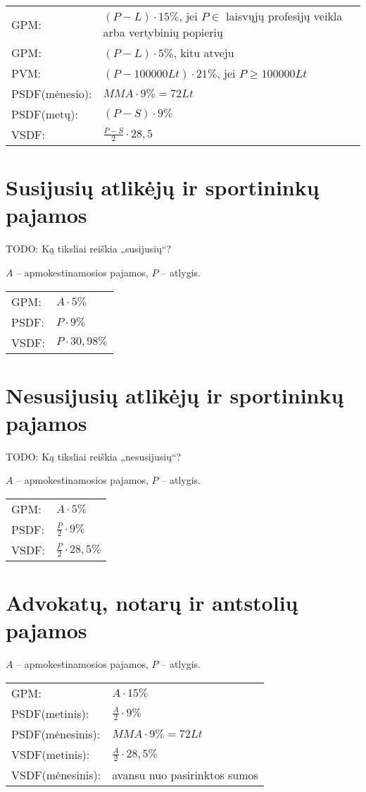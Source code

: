 \begin{tabularx}{15cm}{p{7.5cm}|p{7.5cm}}
  GPM: & $(P - L) \cdot 15\%$, jei $P \in$ laisvųjų profesijų veikla arba
    vertybinių popierių \\
  GPM: & $(P - L) \cdot 5\%$, kitu atveju \\
  PVM: & $(P - 100 000 Lt) \cdot 21\%$, jei $P \geq 100 000 Lt$ \\
  PSDF(mėnesio): & $MMA \cdot 9\% = 72 Lt$ \\
  PSDF(metų): & $(P - S) \cdot 9\%$ \\
  VSDF: & $\frac{P-S}{2} \cdot 28,5$ \\
\end{tabularx}

\section{Susijusių atlikėjų ir sportininkų pajamos}

TODO: Ką tiksliai reiškia „susijusių“?

$A$ – apmokestinamosios pajamos, $P$ – atlygis.

\begin{tabularx}{15cm}{p{7.5cm}|p{7.5cm}}
  GPM: & $A \cdot 5\%$ \\
  PSDF: & $P \cdot 9\%$ \\
  VSDF: & $P \cdot 30,98\%$ \\
\end{tabularx}

\section{Nesusijusių atlikėjų ir sportininkų pajamos}

TODO: Ką tiksliai reiškia „nesusijusių“?

$A$ – apmokestinamosios pajamos, $P$ – atlygis.

\begin{tabularx}{15cm}{p{7.5cm}|p{7.5cm}}
  GPM: & $A \cdot 5\%$ \\
  PSDF: & $\frac{P}{2} \cdot 9\%$ \\
  VSDF: & $\frac{P}{2} \cdot 28,5\%$ \\
\end{tabularx}

\section{Advokatų, notarų ir antstolių pajamos}

$A$ – apmokestinamosios pajamos, $P$ – atlygis.

\begin{tabularx}{15cm}{p{7.5cm}|p{7.5cm}}
  GPM: & $A \cdot 15\%$ \\
  PSDF(metinis): & $\frac{A}{2} \cdot 9\%$ \\
  PSDF(mėnesinis): & $MMA \cdot 9\% = 72 Lt$ \\
  VSDF(metinis): & $\frac{A}{2} \cdot 28,5\%$ \\
  VSDF(mėnesinis): & avansu nuo pasirinktos sumos \\
\end{tabularx}
